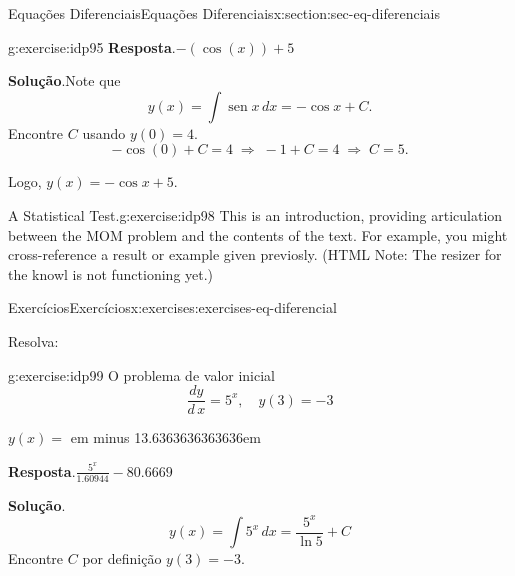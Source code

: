 \documentclass[oneside,10pt,]{article}
\newcommand{\blocktitlefont}{\relax}
\newcommand{\fillin}[1]{\leavevmode\leaders\vrule height -1.2pt depth 1.5pt \hskip #1em minus #1em \null}
\numberwithin{equation}{section}
\DeclareMathOperator{\sin}{sen}
\begin{document}
\begin{sectionptx}{Equações Diferenciais}{}{Equações Diferenciais}{}{}{x:section:sec-eq-diferenciais}
\begin{inlineexercise}{}{g:exercise:idp95}
\noindent\textbf{\blocktitlefont Resposta}.\hypertarget{g:answer:idp96}{}\quad{}\(-\left(\cos\!\left(x\right)\right)+5\)%
\par\smallskip%
\noindent\textbf{\blocktitlefont Solução}.\hypertarget{g:solution:idp97}{}\quad{}Note que%
\begin{equation*}
y(x) = \int \sin x \, dx = -\cos x + C.
\end{equation*}
Encontre \(C\) usando \(y(0) = 4\).%
\begin{equation*}
-\cos(0) + C = 4 \;\Rightarrow\; -1 + C = 4
\;\Rightarrow\; C = 5.
\end{equation*}
%
\par
Logo, \(y(x) = -\cos x + 5\).%
\end{inlineexercise}%
\begin{inlineexercise}{A Statistical Test.}{g:exercise:idp98}%
This is an introduction, providing articulation between the MOM problem and the contents of the text.  For example, you might cross-reference a result or example given previosly.  (HTML Note: The resizer for the knowl is not functioning yet.)%
\end{inlineexercise}%
%
%
\typeout{************************************************}
\typeout{************************************************}
%
\begin{exercises-subsection}{Exercícios}{}{Exercícios}{}{}{x:exercises:exercises-eq-diferencial}
\par\medskip\noindent%
%
Resolva:%
\begin{exercisegroup}
\begin{divisionexerciseeg}{1}{}{}{g:exercise:idp99}%
O problema de valor inicial%
\begin{equation*}
\dfrac{dy}{d\,x} = 5^x, \quad y(3) = -3
\end{equation*}
%
\par
\(y(x) =\) \fillin{13.6363636363636}%
\par\smallskip%
\noindent\textbf{\blocktitlefont Resposta}.\hypertarget{g:answer:idp100}{}\quad{}\(\frac{5^{x}}{1.60944}-80.6669\)%
\par\smallskip%
\noindent\textbf{\blocktitlefont Solução}.\hypertarget{g:solution:idp101}{}\quad{}%
\begin{equation*}
y(x) =\int 5^x \, dx = \dfrac{5^x}{\ln 5} + C
\end{equation*}
Encontre \(C\) por definição \(y(3) = -3\).%
\begin{equation*}
\begin{array}{rcl}  

\end{array}
\end{equation*}
\end{divisionexerciseeg}
\end{exercisegroup}
\end{exercises-subsection}
\end{sectionptx}
\end{document}

